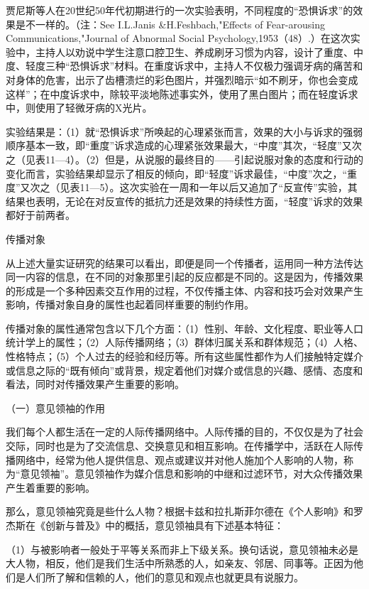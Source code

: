 \documentclass[UTF8,12pt]{ctexart}
\numberwithin{equation}{section} %
\numberwithin{figure}{section}
\numberwithin{table}{section}
\begin{document}
	贾尼斯等人在20世纪50年代初期进行的一次实验表明，不同程度的“恐惧诉求”的效果是不一样的。（注：See I.L.Janis \&H.Feshbach,"Effects of Fear-arousing Communications,"Journal of Abnormal Social Psychology,1953（48）.）在这次实验中，主持人以劝说中学生注意口腔卫生、养成刷牙习惯为内容，设计了重度、中度、轻度三种“恐惧诉求”材料。在重度诉求中，主持人不仅极力强调牙病的痛苦和对身体的危害，出示了齿槽溃烂的彩色图片，并强烈暗示“如不刷牙，你也会变成这样”；在中度诉求中，除较平淡地陈述事实外，使用了黑白图片；而在轻度诉求中，则使用了轻微牙病的X光片。
	
	实验结果是：（1）就“恐惧诉求”所唤起的心理紧张而言，效果的大小与诉求的强弱顺序基本一致，即“重度”诉求造成的心理紧张效果最大，“中度”其次，“轻度”又次之（见表11—4）。（2）但是，从说服的最终目的——引起说服对象的态度和行动的变化而言，实验结果却显示了相反的倾向，即“轻度”诉求最佳，“中度”次之，“重度”又次之（见表11—5）。这次实验在一周和一年以后又追加了“反宣传”实验，其结果也表明，无论在对反宣传的抵抗力还是效果的持续性方面，“轻度”诉求的效果都好于前两者。
	
	
	传播对象
	
	从上述大量实证研究的结果可以看出，即便是同一个传播者，运用同一种方法传达同一内容的信息，在不同的对象那里引起的反应都是不同的。这是因为，传播效果的形成是一个多种因素交互作用的过程，不仅传播主体、内容和技巧会对效果产生影响，传播对象自身的属性也起着同样重要的制约作用。
	
	传播对象的属性通常包含以下几个方面：（1）性别、年龄、文化程度、职业等人口统计学上的属性；（2）人际传播网络；（3）群体归属关系和群体规范；（4）人格、性格特点；（5）个人过去的经验和经历等。所有这些属性都作为人们接触特定媒介或信息之际的“既有倾向”或背景，规定着他们对媒介或信息的兴趣、感情、态度和看法，同时对传播效果产生重要的影响。
	
	（一）意见领袖的作用
	
	我们每个人都生活在一定的人际传播网络中。人际传播的目的，不仅仅是为了社会交际，同时也是为了交流信息、交换意见和相互影响。在传播学中，活跃在人际传播网络中，经常为他人提供信息、观点或建议并对他人施加个人影响的人物，称为“意见领袖”。意见领袖作为媒介信息和影响的中继和过滤环节，对大众传播效果产生着重要的影响。
	
	那么，意见领袖究竟是些什么人物？根据卡兹和拉扎斯菲尔德在《个人影响》和罗杰斯在《创新与普及》中的概括，意见领袖具有下述基本特征：
	
	（1）与被影响者一般处于平等关系而非上下级关系。换句话说，意见领袖未必是大人物，相反，他们是我们生活中所熟悉的人，如亲友、邻居、同事等。正因为他们是人们所了解和信赖的人，他们的意见和观点也就更具有说服力。
	
\end{document}
